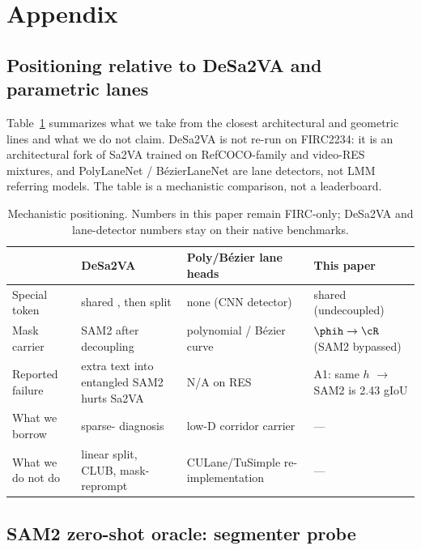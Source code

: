 \section{Appendix}

\subsection{Positioning relative to DeSa2VA and parametric lanes}
\label{app:position}

Table~\ref{tab:pos} summarizes what we take from the closest architectural and geometric lines and what we do not claim.
DeSa2VA is not re-run on FIRC2234: it is an architectural fork of Sa2VA trained on RefCOCO-family and video-RES mixtures, and PolyLaneNet / B\'ezierLaneNet are lane detectors, not LMM referring models.
The table is a mechanistic comparison, not a leaderboard.

\begin{table}[t]
\centering
\footnotesize
\setlength{\tabcolsep}{4pt}
\caption{Mechanistic positioning. Numbers in this paper remain FIRC-only; DeSa2VA and lane-detector numbers stay on their native benchmarks.}
\label{tab:pos}
\begin{tabularx}{\textwidth}{@{}lXXX@{}}
\toprule
 & DeSa2VA \citep{dang2025desa2va} & Poly/B\'ezier lane heads \citep{tabelini2021polylanenet,feng2022bezierlanenet} & This paper \\
\midrule
Special token & shared \Seg{}, then split & none (CNN detector) & shared \Seg{} (undecoupled) \\
Mask carrier & SAM2 after decoupling & polynomial / B\'ezier curve & $\phih \to \cR$ (SAM2 bypassed) \\
Reported failure & extra text into entangled SAM2 hurts Sa2VA & N/A on RES & A1: same $h$ $\to$ SAM2 is 2.43 gIoU \\
What we borrow & sparse-\Seg{} diagnosis & low-D corridor carrier & --- \\
What we do not do & linear split, CLUB, mask-reprompt & CULane/TuSimple re-implementation & --- \\
\bottomrule
\end{tabularx}
\end{table}

\subsection{SAM2 zero-shot oracle: segmenter probe}
\label{app:oracle}

